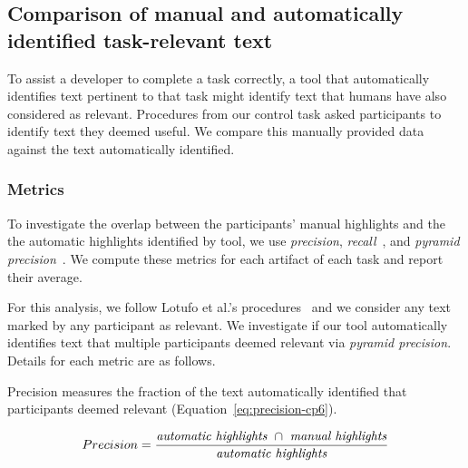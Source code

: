 
\subsection{Comparison of manual and automatically identified task-relevant text}
\label{cp6:comparison}



To assist a developer to complete a task correctly, a tool that
automatically identifies text pertinent to that task might 
identify text that humans have also considered as relevant.
Procedures from our control task asked participants to identify text they deemed useful. We
 compare this manually provided data against the text automatically identified.




\subsubsection{Metrics}

To investigate the overlap between the participants' manual highlights and the 
the automatic highlights identified by \acs{tool}, we use \textit{precision}, 
\textit{recall}~\cite{manning2010IR}, and \textit{pyramid precision}~\cite{Nenkova2004}.
We compute these metrics for each artifact of each task and report their average.


For this analysis, we follow Lotufo et al.'s procedures~\cite{Lotufo2012} and we consider any text marked by any participant as relevant.
We investigate if our tool  automatically identifies text that multiple participants deemed relevant
 via \textit{pyramid precision}. 
Details for each metric are as follows. 


Precision measures the fraction of the text automatically identified  that participants deemed relevant (Equation~\ref{eq:precision-cp6}). 

\medskip
\begin{small}
\begin{equation}
    Precision = \frac{
        \text{\textit{automatic highlights}~} \cap 
        \text{~\textit{manual highlights}}
    }{\text{\textit{automatic highlights}}}
\label{eq:precision-cp6}    
\end{equation}
\end{small}


